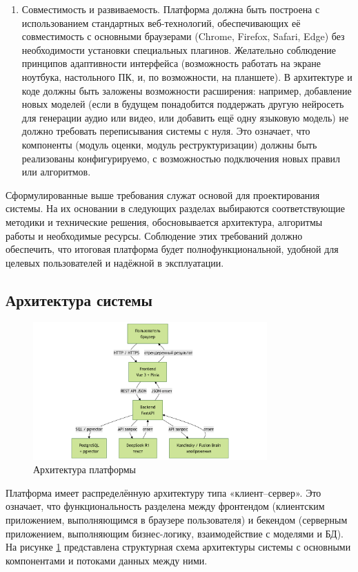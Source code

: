 \begin{enumerate}[label=\arabic*]
    \item Совместимость и развиваемость. Платформа должна быть построена с использованием стандартных веб-технологий, обеспечивающих её совместимость с основными браузерами (Chrome, Firefox, Safari, Edge) без необходимости установки специальных плагинов. Желательно соблюдение принципов адаптивности интерфейса (возможность работать на экране ноутбука, настольного ПК, и, по возможности, на планшете). В архитектуре и коде должны быть заложены возможности расширения: например, добавление новых моделей (если в будущем понадобится поддержать другую нейросеть для генерации аудио или видео, или добавить ещё одну языковую модель) не должно требовать переписывания системы с нуля. Это означает, что компоненты (модуль оценки, модуль реструктуризации) должны быть реализованы конфигурируемо, с возможностью подключения новых правил или алгоритмов.
\end{enumerate}
Сформулированные выше требования служат основой для проектирования системы. На их основании в следующих разделах выбираются соответствующие методики и технические решения, обосновывается архитектура, алгоритмы работы и необходимые ресурсы. Соблюдение этих требований должно обеспечить, что итоговая платформа будет полнофункциональной, удобной для целевых пользователей и надёжной в эксплуатации.
\subsection{Архитектура системы}
\begin{figure}[htbp]
    \centering
    \includegraphics[width=0.8\textwidth]{picture/app-architecture.png}
    \caption{Архитектура платформы}
    \label{architecture}
\end{figure}
 Платформа имеет распределённую архитектуру типа «клиент–сервер». Это означает, что функциональность разделена между фронтендом (клиентским приложением, выполняющимся в браузере пользователя) и бекендом (серверным приложением, выполняющим бизнес-логику, взаимодействие с моделями и БД). На рисунке \ref{architecture} представлена структурная схема архитектуры системы с основными компонентами и потоками данных между ними.

